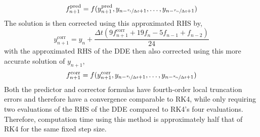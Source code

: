 %
\begin{equation}
    f_{n+1}^\text{pred} = f(y_{n+1}^\text{pred}, y_{n - \sfrac{\tau_1}{\Delta t} + 1}, \dots , y_{n - \sfrac{\tau_m}{\Delta t}  + 1})
\end{equation}
%
The solution is then corrected using this approximated RHS by,
%
\begin{equation*}
     y_{n+1}^\text{corr} = y_n + \frac{\Delta t (9 f_{n+1}^\text{corr} + 19 f_{n} - 5 f_{n-1} + f_{n-2})}{24}   
\end{equation*}
%
with the approximated RHS of the DDE then also corrected using this more accurate solution of $y_{n+1}$,
%
\begin{equation*}
        f_{n+1}^\text{corr} = f(y_{n+1}^\text{corr}, y_{n - \sfrac{\tau_1}{\Delta t} + 1}, \dots , y_{n - \sfrac{\tau_m}{\Delta t}  + 1})
\end{equation*}
%
Both the predictor and corrector formulas have fourth-order local truncation errors and therefore have a convergence comparable to RK4, while only requiring two evaluations of the RHS of the DDE compared to RK4's four evaluations. Therefore, computation time using this method is approximately half that of RK4 for the same fixed step size.
%


